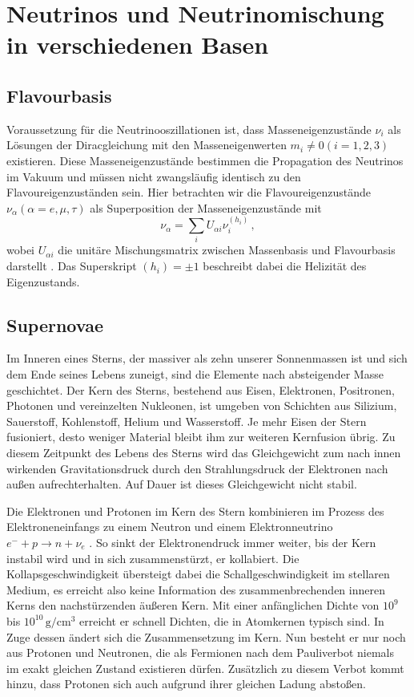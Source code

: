 \chapter{Neutrinos und Neutrinomischung in verschiedenen Basen}
\label{chap:neutrinobasen}

\section{Flavourbasis} %
\label{subsec:flavourbasis}
Voraussetzung für die Neutrinooszillationen ist, dass Masseneigenzustände $\nu_i$ als Lösungen der Diracgleichung mit den Masseneigenwerten $m_i \neq 0 (i = 1, 2, 3)$ existieren.
Diese Masseneigenzustände bestimmen die Propagation des Neutrinos im Vakuum und müssen nicht zwangsläufig identisch zu den Flavoureigenzuständen sein.
Hier betrachten wir die Flavoureigenzustände $\nu_\alpha (\alpha = e, \mu, \tau)$ als Superposition der Masseneigenzustände mit
\begin{equation}
    \nu_\alpha = \sum_i U_{\alpha i} \nu^{(h_i)}_i \,,
    \label{eq:flavourbasis}
\end{equation}
wobei $U_{\alpha i}$ die unitäre Mischungsmatrix zwischen Massenbasis und Flavourbasis darstellt \cite[Kap. 2.1]{oberauer}.
Das Superskript $(h_i) = \pm 1$ beschreibt dabei die Helizität des Eigenzustands.


\section{Supernovae}

Im Inneren eines Sterns, der massiver als zehn unserer Sonnenmassen ist und sich dem Ende seines Lebens zuneigt, sind die Elemente nach absteigender Masse geschichtet.
Der Kern des Sterns, bestehend aus Eisen, Elektronen, Positronen, Photonen und vereinzelten Nukleonen, ist umgeben von Schichten aus Silizium, Sauerstoff, Kohlenstoff, Helium und Wasserstoff.
Je mehr Eisen der Stern fusioniert, desto weniger Material bleibt ihm zur weiteren Kernfusion übrig.
Zu diesem Zeitpunkt des Lebens des Sterns wird das Gleichgewicht zum nach innen wirkenden Gravitationsdruck durch den Strahlungsdruck der Elektronen nach außen aufrechterhalten. 
Auf Dauer ist dieses Gleichgewicht nicht stabil.

Die Elektronen und Protonen im Kern des Stern kombinieren im Prozess des Elektroneneinfangs zu einem Neutron und einem Elektronneutrino $e^- + p \rightarrow n + \nu_e$ \cite{supernovaepaper}.
So sinkt der Elektronendruck immer weiter, bis der Kern instabil wird und in sich zusammenstürzt, er kollabiert.
Die Kollapsgeschwindigkeit übersteigt dabei die Schallgeschwindigkeit im stellaren Medium, es erreicht also keine Information des zusammenbrechenden inneren Kerns den nachstürzenden äußeren Kern.
Mit einer anfänglichen Dichte von $10^9$ bis $10^{10} \, \si{\gram \per \centi\cubic\meter}$ erreicht er schnell Dichten, die in Atomkernen typisch sind.
In Zuge dessen ändert sich die Zusammensetzung im Kern.
Nun besteht er nur noch aus Protonen und Neutronen, die als Fermionen nach dem Pauliverbot niemals im exakt gleichen Zustand existieren dürfen.
Zusätzlich zu diesem Verbot kommt hinzu, dass Protonen sich auch aufgrund ihrer gleichen Ladung abstoßen.

